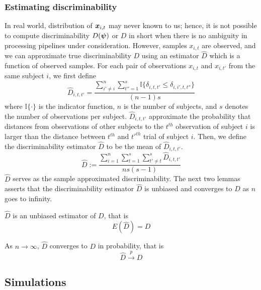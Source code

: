 \documentclass{article}
\begin{document}
\subsubsection{Estimating discriminability}
In real world, distribution of $\boldsymbol{x}_{i,t}$ may never known to us; hence, it is not possible to compute discriminability $D(\boldsymbol{\psi})$ or $D$ in short when there is no ambiguity in processing pipelines under consideration. However, samples $x_{i,t}$ are observed, and we can approximate true discriminability $D$ using an estimator $\hat{D}$ which is a function of observed samples. For each pair of observations $x_{i,t}$ and $x_{i,t'}$ from the same subject $i$, we first define
\[ \hat{D}_{i,t,t'} = \frac{\sum\limits_{i' \neq i}^{n} \sum\limits_{t''=1}^{s} \mathbb{I}\{\delta_{i,t,t'} \leq \delta_{i,i',t,t''} \} }{(n-1)s}\]
where $\mathbb{I}\{ \cdot \} $ is the indicator function, $n$ is the number of subjects, and $s$ denotes the number of observations per subject. $\hat{D}_{i,t,t'}$ approximate the probability that distances from observations of other subjects to the $t^{th}$ observation of subject $i$ is larger than the distance between $t^{th}$ and $t'^{th}$ trial of subject $i$. Then, we define the discriminability estimator $\hat{D}$ to be the mean of $\hat{D}_{i,t,t'}$.
\[ \hat{D} := \frac{\sum\limits_{i=1}^{n} \sum\limits_{t=1}^{s}  \sum\limits_{t' \neq t}^{s} \hat{D}_{i,t,t'}}{ns(s-1)} \]
$\hat{D}$ serves as the sample approximated discriminability. The next two lemmas asserts that the discriminability estimator $\hat{D}$ is unbiased and converges to $D$ as $n$ goes to infinity.

\begin{lem}	
	$\hat{D}$ is an unbiased estimator of $D$, that is
	\[ E(\hat{D}) = D\]
\end{lem}

\begin{lem}	
	As $n \rightarrow \infty$, $\hat{D}$ converges to $D$ in probability, that is
	\[\hat{D} \overset{p}{\rightarrow} D \]
\end{lem}



\subsection{Simulations}
\end{document}
